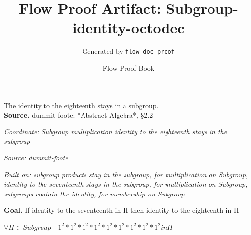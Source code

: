 \documentclass[11pt]{article}
\title{Flow Proof Artifact: Subgroup-identity-octodec}
\author{Generated by \texttt{flow doc proof}}
\date{Flow Proof Book}
\theoremstyle{definition}
\begin{document}
\maketitle
The identity to the eighteenth stays in a subgroup.\\[0.5em]
\textbf{Source.} dummit-foote: *Abstract Algebra*, §2.2\\[0.5em]
\bigskip
{}\par
\smallskip\noindent\textit{Coordinate: Subgroup \cdot multiplication \cdot identity to the eighteenth stays in the subgroup}\par
\smallskip\noindent\textit{Source: dummit-foote}\par
\smallskip\noindent\textit{Built on: subgroup products stay in the subgroup, for multiplication on Subgroup, identity to the seventeenth stays in the subgroup, for multiplication on Subgroup, subgroups contain the identity, for membership on Subgroup}\par
\medskip
\noindent\textbf{Goal.} If identity to the seventeenth in H then identity to the eighteenth in H\par
\noindent$\displaystyle \forall H \in Subgroup\quad 1^{2} * 1^{2} * 1^{2} * 1^{2} * 1^{2} * 1^{2} * 1^{2} * 1^{2} * 1^{2} in H$\par
\medskip
\noindent
\end{document}
